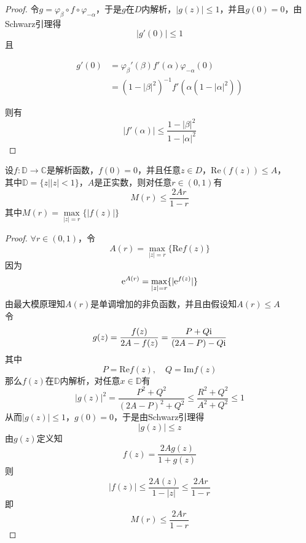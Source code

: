 \begin{proof}
    
    令$g = \varphi_{\beta}\circ f \circ \varphi_{-\alpha}$，于是$g$在$D$内解析，$|g(z)| \leq 1$，并且$g(0) = 0$，由\textup{Schwarz}引理得
    \[|g'(0)| \leq 1\]
    且
    
    \begin{align*}
        g'(0) & = \varphi_{\beta}'(\beta) f'(\alpha) \varphi_{-\alpha}(0) \\
        & =  (1 - |\beta|^2)^{-1}f'(\alpha (1 - |\alpha|^2))
    \end{align*}

    则有
    \[|f'(\alpha)| \leq \dfrac{1 - |\beta|^2}{1 - |\alpha|^2}\]

\end{proof}

\begin{proposition}
    
    设$f:\mathbb{D} \to \mathbb{C}$是解析函数，$f(0) = 0$，并且任意$z \in D$，$\mathrm{Re}(f(z)) \leq A$，\\
    其中$\mathbb{D} = \{z \big| |z| < 1\}$，$A$是正实数，则对任意$r \in (0, 1)$有
    \[M(r) \leq \dfrac{2Ar}{1 - r}\]
    其中$M(r) = \max\limits_{|z| = r}\{|f(z)|\}$

\end{proposition}

\begin{proof}
    
    $\forall r \in (0, 1)$，令
    \[A(r) = \max_{|z| = r}\{\mathrm{Re}f(z)\}\]
    因为
    \[\mathrm{e}^{A(r)} = \max_{|z| = r}\{|\mathrm{e}^{f(z)}|\}\]
    由最大模原理知$A(r)$是单调增加的非负函数，并且由假设知$A(r) \leq A$ \\
    令
    \[ g(z) = \dfrac{f(z)}{2A - f(z)} = \dfrac{P + Q\mathrm{i}}{(2A - P) - Q\mathrm{i}} \]
    其中
    \[ P = \mathrm{Re}f(z), \quad Q = \mathrm{Im}f(z) \]
    那么$f(z)$在$\mathbb{D}$内解析，对任意$x \in \mathbb{D}$有
    \[|g(z)|^2 = \dfrac{P^2 + Q^2}{(2A - P)^2 + Q^2} \leq \dfrac{R^2 + Q^2}{A^2 + Q^2} \leq 1\]
    从而$|g(z)| \leq 1$，$g(0) = 0$，于是由\textup{Schwarz}引理得
    \[|g(z) | \leq z\]
    由$g(z)$定义知
    \[f(z) = \dfrac{2Ag(z)}{1 + g(z)}\]
    则
    \[ |f(z)| \leq \dfrac{2A(z)}{1 - |z|} \leq \dfrac{2Ar}{1 - r}\]
    即
    \[M(r) \leq \dfrac{2Ar}{1 - r}\]

\end{proof}

